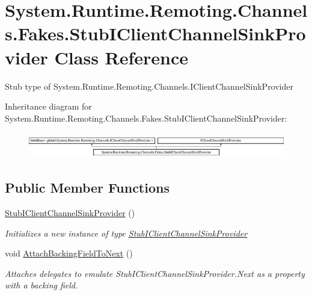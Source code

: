\hypertarget{class_system_1_1_runtime_1_1_remoting_1_1_channels_1_1_fakes_1_1_stub_i_client_channel_sink_provider}{\section{System.\-Runtime.\-Remoting.\-Channels.\-Fakes.\-Stub\-I\-Client\-Channel\-Sink\-Provider Class Reference}
\label{class_system_1_1_runtime_1_1_remoting_1_1_channels_1_1_fakes_1_1_stub_i_client_channel_sink_provider}
}


Stub type of System.\-Runtime.\-Remoting.\-Channels.\-I\-Client\-Channel\-Sink\-Provider 


Inheritance diagram for System.\-Runtime.\-Remoting.\-Channels.\-Fakes.\-Stub\-I\-Client\-Channel\-Sink\-Provider\-:\begin{figure}[H]
\begin{center}
\leavevmode
\includegraphics[height=1.133603cm]{class_system_1_1_runtime_1_1_remoting_1_1_channels_1_1_fakes_1_1_stub_i_client_channel_sink_provider}
\end{center}
\end{figure}
\subsection*{Public Member Functions}
\begin{DoxyCompactItemize}
\item 
\hyperlink{class_system_1_1_runtime_1_1_remoting_1_1_channels_1_1_fakes_1_1_stub_i_client_channel_sink_provider_abe3eb4324ea12fca1d183b315bd60ff4}{Stub\-I\-Client\-Channel\-Sink\-Provider} ()
\begin{DoxyCompactList}\small\item\em Initializes a new instance of type \hyperlink{class_system_1_1_runtime_1_1_remoting_1_1_channels_1_1_fakes_1_1_stub_i_client_channel_sink_provider}{Stub\-I\-Client\-Channel\-Sink\-Provider}\end{DoxyCompactList}\item 
void \hyperlink{class_system_1_1_runtime_1_1_remoting_1_1_channels_1_1_fakes_1_1_stub_i_client_channel_sink_provider_abedbfd56e7f006471a15f4946cfb29dc}{Attach\-Backing\-Field\-To\-Next} ()
\begin{DoxyCompactList}\small\item\em Attaches delegates to emulate Stub\-I\-Client\-Channel\-Sink\-Provider.\-Next as a property with a backing field.\end{DoxyCompactList}\end{DoxyCompactItemize}
